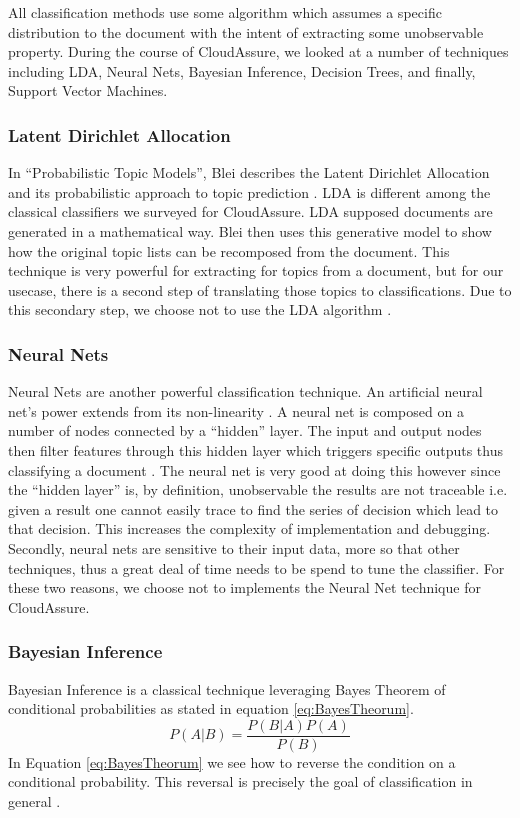 All classification methods use some algorithm which assumes a specific
distribution to the document with the intent of extracting some unobservable
property. During the course of CloudAssure, we looked at a number of techniques
including \gls{LDA}, Neural Nets, Bayesian Inference, Decision Trees, and finally,
Support Vector Machines.

\subsubsection{Latent Dirichlet Allocation}
In ``Probabilistic Topic Models'', Blei describes the Latent Dirichlet
Allocation and its probabilistic approach to topic prediction
\autocite{Blei2012}. \gls{LDA} is different among the classical classifiers we
surveyed for CloudAssure. \gls{LDA} supposed documents are generated in
a mathematical way. Blei then uses this generative model to show how the original topic lists can be
recomposed from the document. This technique is very powerful for extracting for
topics from a document, but for our usecase, there is a second step of
translating those topics to classifications. Due to this secondary step, we
choose not to use the LDA algorithm \autocite{RadimRehurek2010}.

\subsubsection{Neural Nets}
Neural Nets are another powerful classification technique. An artificial neural
net's power
extends from its non-linearity \autocite{Zhang2000}. A neural net is composed on
a number of nodes connected by a ``hidden'' layer. The input and output nodes
then filter features through this hidden layer which triggers specific outputs
thus classifying a document \autocite{Merkl}. The neural net is very good at
doing this however since the ``hidden layer'' is, by definition, unobservable
the results are not traceable i.e. given a result one cannot easily trace to
find the series of decision which lead to that decision. This increases the
complexity of implementation and debugging. Secondly, neural nets are sensitive
to their input data, more so that other techniques, thus a great deal of time
needs to be spend to tune the classifier. For these two reasons, we choose not
to implements the Neural Net technique for CloudAssure. 

\subsubsection{Bayesian Inference}
Bayesian Inference is a classical technique leveraging Bayes Theorem of
conditional probabilities as stated in equation \ref{eq:BayesTheorum}.
\begin{equation}
    P(A|B) = \frac{P(B | A) P(A)}{P(B)}
    \label{eq:BayesTheorum}
\end{equation}
In Equation \ref{eq:BayesTheorum} we see how to reverse the condition on a conditional probability.
This reversal is precisely the goal of classification in general \autocite{Bishop2009}.

